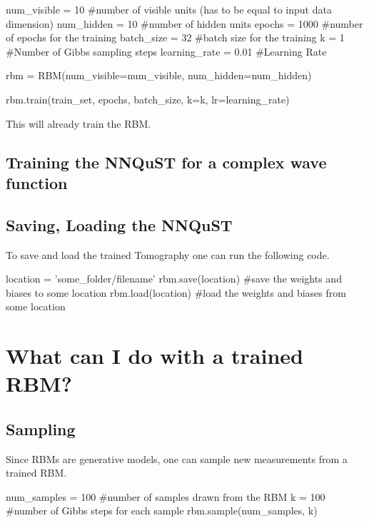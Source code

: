 \documentclass[submission, Phys]{SciPost}
\begin{document}
\begin{python}
num_visible = 10 #number of visible units (has to be equal to input data dimension)
num_hidden = 10 #number of hidden units
epochs = 1000 #number of epochs for the training
batch_size = 32 #batch size for the training
k = 1 #Number of Gibbs sampling steps
learning_rate = 0.01 #Learning Rate
\end{python}



\begin{python}
rbm = RBM(num_visible=num_visible, num_hidden=num_hidden)

rbm.train(train_set, epochs, batch_size, k=k, lr=learning_rate)
\end{python}

This will already train the RBM.

\subsection{Training the NNQuST for a complex wave function}


\subsection{Saving, Loading the NNQuST}

To save and load the trained Tomography one can run the following code.

\begin{python}
location = 'some_folder/filename'
rbm.save(location) #save the weights and biases to some location
rbm.load(location) #load the weights and biases from some location
\end{python}

\section{What can I do with a trained RBM?}

\subsection{Sampling}

Since RBMs are generative models, one can sample new measurements from a trained RBM.

\begin{python}
num_samples = 100 #number of samples drawn from the RBM
k = 100 #number of Gibbs steps for each sample
rbm.sample(num_samples, k)
\end{python}
\end{document}
